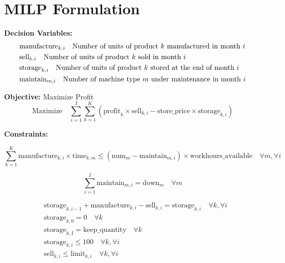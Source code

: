 \documentclass{article}
\begin{document}
\section*{MILP Formulation}

\textbf{Decision Variables:}
\begin{align*}
& \text{manufacture}_{k, i} \quad \text{Number of units of product \( k \) manufactured in month \( i \)} \\
& \text{sell}_{k, i} \quad \text{Number of units of product \( k \) sold in month \( i \)} \\
& \text{storage}_{k, i} \quad \text{Number of units of product \( k \) stored at the end of month \( i \)} \\
& \text{maintain}_{m, i} \quad \text{Number of machine type \( m \) under maintenance in month \( i \)}
\end{align*}

\textbf{Objective:} Maximize Profit
\[
\text{Maximize} \quad \sum_{i=1}^{I} \sum_{k=1}^{K} \left( \text{profit}_{k} \times \text{sell}_{k, i} - \text{store\_price} \times \text{storage}_{k, i} \right)
\]

\textbf{Constraints:}

\[
\sum_{k=1}^{K} \text{manufacture}_{k, i} \times \text{time}_{k, m} \leq (\text{num}_{m} - \text{maintain}_{m, i}) \times \text{workhours\_available} \quad \forall m, \forall i
\]

\[
\sum_{i=1}^{I} \text{maintain}_{m, i} = \text{down}_{m} \quad \forall m
\]

\begin{align*}
& \text{storage}_{k, i-1} + \text{manufacture}_{k, i} - \text{sell}_{k, i} = \text{storage}_{k, i} \quad \forall k, \forall i\\
& \text{storage}_{k, 0} = 0 \quad \forall k \\
& \text{storage}_{k, I} = \text{keep\_quantity} \quad \forall k \\
& \text{storage}_{k, i} \leq 100 \quad \forall k, \forall i \\
& \text{sell}_{k, i} \leq \text{limit}_{k, i} \quad \forall k, \forall i
\end{align*}
\end{document}
